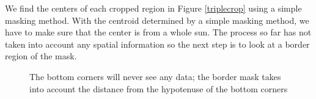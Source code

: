 \documentclass[10pt]{scrartcl}
\begin{document}
	We find the centers of each cropped region in Figure \ref{triplecrop} using a simple masking method. With the centroid determined by a simple masking method, we have to make sure that the center is from a whole sun. The process so far has not taken into account any spatial information so the next step is to look at a border region of the mask. 

\begin{figure}[!ht]
{\caption{The bottom corners will never see any data; the border mask takes into account the distance from the hypotenuse of the bottom corners}
\label{cuttingcorners}
}
\end{figure}
\end{document}
